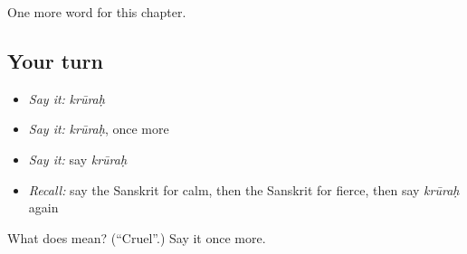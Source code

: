 \begin{grammarlens}[title={What you've built}]
One more word for this chapter.
\end{grammarlens}

\subsection*{Your turn}
\begin{itemize}
\raggedright
  \item \emph{Say it:} \emph{krūraḥ}
  \item \emph{Say it:} \emph{krūraḥ}, once more
  \item \emph{Say it:} say \emph{krūraḥ}
  \item \emph{Recall:} say the Sanskrit for calm, then the Sanskrit for fierce, then say \emph{krūraḥ} again
\end{itemize}

\begin{tcolorbox}[breakable,colback=teal!4,colframe=teal!35!black,title={Before you move on}]
What does  mean? (\textquotedblleft{}Cruel\textquotedblright{}.) Say it once more.
\end{tcolorbox}
